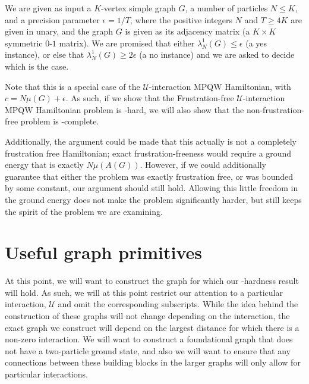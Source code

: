 \documentclass[../thesis-main/thesis-main]{subfiles}
\begin{document}
\begin{problem}
  We are given as input a $K$-vertex simple graph $G$, a number of particles $N\leq K$, and a precision parameter $\epsilon = 1/T$, where the positive integers $N$ and $T \geq 4K$ are given in unary, and the graph $G$ is given as its adjacency matrix (a $K\times K$ symmetric $0$-$1$ matrix). We are promised that either $\lambda_N^1(G) \leq \epsilon$ (a yes instance), or else that $\lambda_N^1(G) \geq 2\epsilon $ (a no instance) and we are asked to decide which is the case.
\end{problem}

Note that this is a special case of the $\mathcal{U}$-interaction MPQW Hamiltonian, with $c = N\mu(G) + \epsilon$.  As such, if we show that the Frustration-free $\mathcal{U}$-interaction MPQW Hamiltonian problem is \QMA-hard, we will also show that the non-frustration-free problem is \QMA-complete.

Additionally, the argument could be made that this actually is not a completely frustration free Hamiltonian; exact frustration-freeness would require a ground energy that is exactly $N\mu(A(G))$.  However, if we could additionally guarantee that either the problem was exactly frustration free, or was bounded by some constant, our argument should still hold.  Allowing this little freedom in the ground energy does not make the problem significantly harder, but still keeps the spirit of the problem we are examining.

\section{Useful graph primitives}\label{sec:graph_primitives}

At this point, we will want to construct the graph for which our \QMA-hardness result will hold.  As such, we will at this point restrict our attention to a particular interaction, $\mathcal{U}$ and omit the corresponding subscripts.  While the idea behind the construction of these graphs will not change depending on the interaction, the exact graph we construct will depend on the largest distance for which there is a non-zero interaction.  We will want to construct a foundational graph that does not have a two-particle ground state, and also we will want to ensure that any connections between these building blocks in the larger graphs will only allow for particular interactions.
\end{document}
